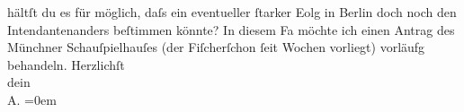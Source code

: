 \begin{ledgroupsized}[t]{13cm}
               hältſt du es für möglich, daſs ein eventueller ſtarker Eolg in Berlin doch noch den Intendantenanders beſtimmen
               könnte? In diesem Fa möchte ich einen Antrag des Münchner
                  Schauſpielhauſes (der Fiſcherſchon ſeit Wochen vorliegt) vorläufg \label{K_L01581_1v}\label{K_L01581_1h} behandeln.\pend
           \pstart
           Herzlichſt{\\[\baselineskip]}dein{\\[\baselineskip]}\spacefill\mbox{A.}\pend
           \leftskip=0em{}
         
         \endnumbering{}\end{ledgroupsized}  \newcommand{\dateiname}{L01581}\newcommand{\titel}{Arthur Schnitzler an Hermann Bahr, 3. 2. 1906}\newcommand{\editorInnen}{ Kurt Ifkovits,  Martin Anton Müller}
      